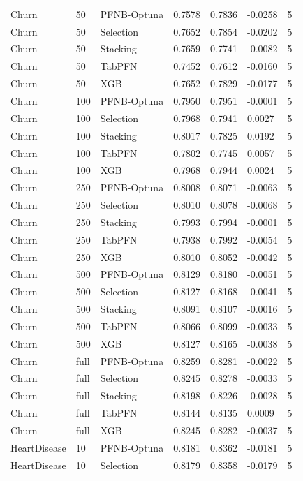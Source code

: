\begin{tabular}{llllllr}
Churn & 50 & PFNB-Optuna & 0.7578 & 0.7836 & -0.0258 & 5 \\
Churn & 50 & Selection & 0.7652 & 0.7854 & -0.0202 & 5 \\
Churn & 50 & Stacking & 0.7659 & 0.7741 & -0.0082 & 5 \\
Churn & 50 & TabPFN & 0.7452 & 0.7612 & -0.0160 & 5 \\
Churn & 50 & XGB & 0.7652 & 0.7829 & -0.0177 & 5 \\
Churn & 100 & PFNB-Optuna & 0.7950 & 0.7951 & -0.0001 & 5 \\
Churn & 100 & Selection & 0.7968 & 0.7941 & 0.0027 & 5 \\
Churn & 100 & Stacking & 0.8017 & 0.7825 & 0.0192 & 5 \\
Churn & 100 & TabPFN & 0.7802 & 0.7745 & 0.0057 & 5 \\
Churn & 100 & XGB & 0.7968 & 0.7944 & 0.0024 & 5 \\
Churn & 250 & PFNB-Optuna & 0.8008 & 0.8071 & -0.0063 & 5 \\
Churn & 250 & Selection & 0.8010 & 0.8078 & -0.0068 & 5 \\
Churn & 250 & Stacking & 0.7993 & 0.7994 & -0.0001 & 5 \\
Churn & 250 & TabPFN & 0.7938 & 0.7992 & -0.0054 & 5 \\
Churn & 250 & XGB & 0.8010 & 0.8052 & -0.0042 & 5 \\
Churn & 500 & PFNB-Optuna & 0.8129 & 0.8180 & -0.0051 & 5 \\
Churn & 500 & Selection & 0.8127 & 0.8168 & -0.0041 & 5 \\
Churn & 500 & Stacking & 0.8091 & 0.8107 & -0.0016 & 5 \\
Churn & 500 & TabPFN & 0.8066 & 0.8099 & -0.0033 & 5 \\
Churn & 500 & XGB & 0.8127 & 0.8165 & -0.0038 & 5 \\
Churn & full & PFNB-Optuna & 0.8259 & 0.8281 & -0.0022 & 5 \\
Churn & full & Selection & 0.8245 & 0.8278 & -0.0033 & 5 \\
Churn & full & Stacking & 0.8198 & 0.8226 & -0.0028 & 5 \\
Churn & full & TabPFN & 0.8144 & 0.8135 & 0.0009 & 5 \\
Churn & full & XGB & 0.8245 & 0.8282 & -0.0037 & 5 \\
HeartDisease & 10 & PFNB-Optuna & 0.8181 & 0.8362 & -0.0181 & 5 \\
HeartDisease & 10 & Selection & 0.8179 & 0.8358 & -0.0179 & 5 \\

\end{tabular}
